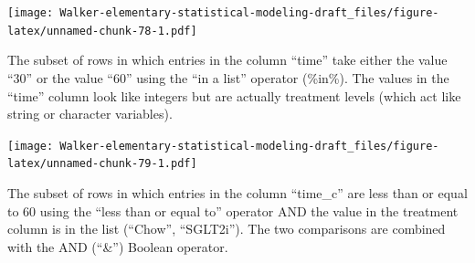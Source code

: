 \documentclass[]{book}
\newenvironment{Shaded}{\begin{snugshade}}{\end{snugshade}}
\newcommand{\DataTypeTok}[1]{\textcolor[rgb]{0.13,0.29,0.53}{#1}}
\newcommand{\DecValTok}[1]{\textcolor[rgb]{0.00,0.00,0.81}{#1}}
\newcommand{\ErrorTok}[1]{\textcolor[rgb]{0.64,0.00,0.00}{\textbf{#1}}}
\newcommand{\KeywordTok}[1]{\textcolor[rgb]{0.13,0.29,0.53}{\textbf{#1}}}
\newcommand{\NormalTok}[1]{#1}
\newcommand{\OperatorTok}[1]{\textcolor[rgb]{0.81,0.36,0.00}{\textbf{#1}}}
\newcommand{\StringTok}[1]{\textcolor[rgb]{0.31,0.60,0.02}{#1}}
\begin{document}
\texttt{[image: Walker-elementary-statistical-modeling-draft\_files/figure-latex/unnamed-chunk-78-1.pdf]}

The subset of rows in which entries in the column ``time'' take either the value ``30'' or the value ``60'' using the ``in a list'' operator (\%in\%). The values in the ``time'' column look like integers but are actually treatment levels (which act like string or character variables).

\begin{Shaded}
\end{Shaded}

\texttt{[image: Walker-elementary-statistical-modeling-draft\_files/figure-latex/unnamed-chunk-79-1.pdf]}

The subset of rows in which entries in the column ``time\_c'' are less than or equal to 60 using the ``less than or equal to'' operator AND the value in the treatment column is in the list (``Chow'', ``SGLT2i''). The two comparisons are combined with the AND (``\&'') Boolean operator.

\begin{Shaded}
\end{Shaded}
\end{document}
